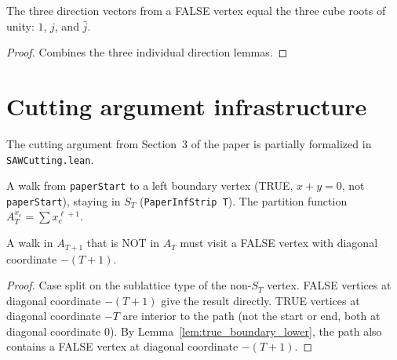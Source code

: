 \begin{lemma}[FALSE direction vectors = cube roots of unity]\label{lem:false_cube_roots}
\leanok
{}
  The three direction vectors from a FALSE vertex equal the three
  cube roots of unity: $1$, $j$, and $\bar{j}$.
\end{lemma}
\begin{proof}
\leanok
  Combines the three individual direction lemmas.
\end{proof}

\section{Cutting argument infrastructure}\label{sec:cutting}

The cutting argument from Section~3 of the paper is partially formalized
in \texttt{SAWCutting.lean}.

\begin{definition}\label{def:A_inf}
\leanok
{}
\leanok
{}
  A walk from \texttt{paperStart} to a left boundary vertex (TRUE, $x{+}y=0$,
  not \texttt{paperStart}), staying in $S_T$ (\texttt{PaperInfStrip T}).
  The partition function $A_T^{x_c} = \sum x_c^{\ell+1}$.
\end{definition}

\begin{lemma}\label{lem:A_diff_boundary}
\leanok
{}
  A walk in $A_{T+1}$ that is NOT in $A_T$ must visit a FALSE vertex
  with diagonal coordinate $-(T{+}1)$.
\end{lemma}
\begin{proof}
\leanok
{}
  Case split on the sublattice type of the non-$S_T$ vertex.
  FALSE vertices at diagonal coordinate $-(T{+}1)$ give the result directly.
  TRUE vertices at diagonal coordinate $-T$ are interior to the path
  (not the start or end, both at diagonal coordinate 0).
  By Lemma~\ref{lem:true_boundary_lower}, the path also contains
  a FALSE vertex at diagonal coordinate $-(T{+}1)$.
\end{proof}


